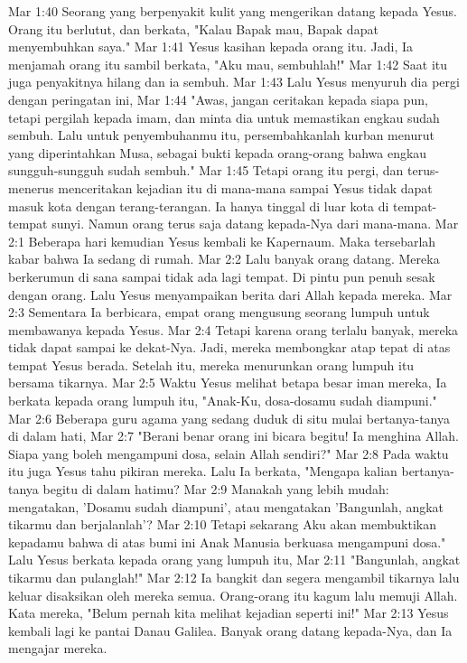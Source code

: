 Mar 1:40  Seorang yang berpenyakit kulit yang mengerikan datang kepada Yesus. Orang itu berlutut, dan berkata, "Kalau Bapak mau, Bapak dapat menyembuhkan saya."
Mar 1:41  Yesus kasihan kepada orang itu. Jadi, Ia menjamah orang itu sambil berkata, "Aku mau, sembuhlah!"
Mar 1:42  Saat itu juga penyakitnya hilang dan ia sembuh.
Mar 1:43  Lalu Yesus menyuruh dia pergi dengan peringatan ini,
Mar 1:44  "Awas, jangan ceritakan kepada siapa pun, tetapi pergilah kepada imam, dan minta dia untuk memastikan engkau sudah sembuh. Lalu untuk penyembuhanmu itu, persembahkanlah kurban menurut yang diperintahkan Musa, sebagai bukti kepada orang-orang bahwa engkau sungguh-sungguh sudah sembuh."
Mar 1:45  Tetapi orang itu pergi, dan terus-menerus menceritakan kejadian itu di mana-mana sampai Yesus tidak dapat masuk kota dengan terang-terangan. Ia hanya tinggal di luar kota di tempat-tempat sunyi. Namun orang terus saja datang kepada-Nya dari mana-mana.
Mar 2:1  Beberapa hari kemudian Yesus kembali ke Kapernaum. Maka tersebarlah kabar bahwa Ia sedang di rumah.
Mar 2:2  Lalu banyak orang datang. Mereka berkerumun di sana sampai tidak ada lagi tempat. Di pintu pun penuh sesak dengan orang. Lalu Yesus menyampaikan berita dari Allah kepada mereka.
Mar 2:3  Sementara Ia berbicara, empat orang mengusung seorang lumpuh untuk membawanya kepada Yesus.
Mar 2:4  Tetapi karena orang terlalu banyak, mereka tidak dapat sampai ke dekat-Nya. Jadi, mereka membongkar atap tepat di atas tempat Yesus berada. Setelah itu, mereka menurunkan orang lumpuh itu bersama tikarnya.
Mar 2:5  Waktu Yesus melihat betapa besar iman mereka, Ia berkata kepada orang lumpuh itu, "Anak-Ku, dosa-dosamu sudah diampuni."
Mar 2:6  Beberapa guru agama yang sedang duduk di situ mulai bertanya-tanya di dalam hati,
Mar 2:7  "Berani benar orang ini bicara begitu! Ia menghina Allah. Siapa yang boleh mengampuni dosa, selain Allah sendiri?"
Mar 2:8  Pada waktu itu juga Yesus tahu pikiran mereka. Lalu Ia berkata, "Mengapa kalian bertanya-tanya begitu di dalam hatimu?
Mar 2:9  Manakah yang lebih mudah: mengatakan, 'Dosamu sudah diampuni', atau mengatakan 'Bangunlah, angkat tikarmu dan berjalanlah'?
Mar 2:10  Tetapi sekarang Aku akan membuktikan kepadamu bahwa di atas bumi ini Anak Manusia berkuasa mengampuni dosa." Lalu Yesus berkata kepada orang yang lumpuh itu,
Mar 2:11  "Bangunlah, angkat tikarmu dan pulanglah!"
Mar 2:12  Ia bangkit dan segera mengambil tikarnya lalu keluar disaksikan oleh mereka semua. Orang-orang itu kagum lalu memuji Allah. Kata mereka, "Belum pernah kita melihat kejadian seperti ini!"
Mar 2:13  Yesus kembali lagi ke pantai Danau Galilea. Banyak orang datang kepada-Nya, dan Ia mengajar mereka.
